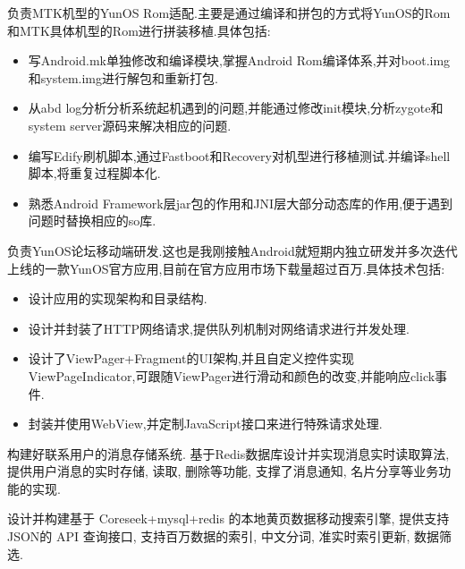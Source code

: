 \documentclass{resume}
\begin{document}
\begin{onehalfspacing}
负责MTK机型的YunOS Rom适配.主要是通过编译和拼包的方式将YunOS的Rom和MTK具体机型的Rom进行拼装移植.具体包括:
\begin{itemize}
  \item 写Android.mk单独修改和编译模块,掌握Android Rom编译体系,并对boot.img和system.img进行解包和重新打包.
  \item 从abd log分析分析系统起机遇到的问题,并能通过修改init模块,分析zygote和system server源码来解决相应的问题.
  \item 编写Edify刷机脚本,通过Fastboot和Recovery对机型进行移植测试.并编译shell脚本,将重复过程脚本化.
  \item 熟悉Android Framework层jar包的作用和JNI层大部分动态库的作用,便于遇到问题时替换相应的so库.
\end{itemize}
\end{onehalfspacing}

\begin{onehalfspacing}
负责YunOS论坛移动端研发.这也是我刚接触Android就短期内独立研发并多次迭代上线的一款YunOS官方应用,目前在官方应用市场下载量超过百万.具体技术包括:
\begin{itemize}
  \item 设计应用的实现架构和目录结构.
  \item 设计并封装了HTTP网络请求,提供队列机制对网络请求进行并发处理.
  \item 设计了ViewPager+Fragment的UI架构,并且自定义控件实现ViewPageIndicator,可跟随ViewPager进行滑动和颜色的改变,并能响应click事件.
  \item 封装并使用WebView,并定制JavaScript接口来进行特殊请求处理.
\end{itemize}
\end{onehalfspacing}

\begin{onehalfspacing}
构建好联系用户的消息存储系统. 基于Redis数据库设计并实现消息实时读取算法, 提供用户消息的实时存储, 读取, 删除等功能, 支撑了消息通知, 名片分享等业务功能的实现.
\end{onehalfspacing}

\begin{onehalfspacing}
设计并构建基于 Coreseek+mysql+redis 的本地黄页数据移动搜索引擎, 提供支持 JSON的 API 查询接口, 支持百万数据的索引, 中文分词, 准实时索引更新, 数据筛选.
\end{onehalfspacing}
\end{document}
